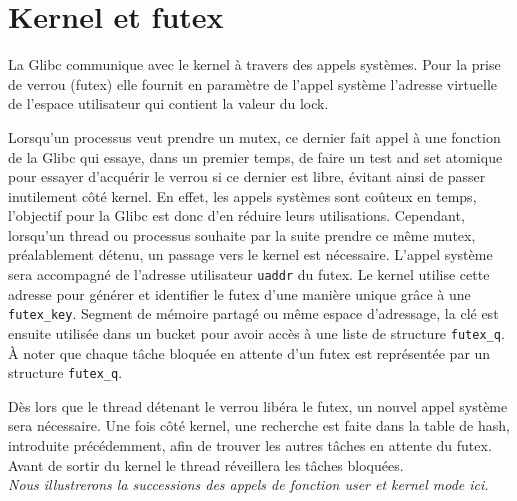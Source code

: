 \section*{Kernel et futex}
La Glibc communique avec le kernel à travers des appels systèmes. Pour la prise de verrou (futex) elle fournit en paramètre de l'appel système l'adresse virtuelle de l'espace utilisateur qui contient la valeur du lock.

Lorsqu'un processus veut prendre un mutex, ce dernier fait appel à une fonction 
de la Glibc qui essaye, dans un premier temps, de faire un test and set atomique pour essayer d'acquérir le verrou si ce dernier est libre, évitant ainsi de passer inutilement côté kernel. En effet, les appels systèmes sont coûteux en temps, l'objectif pour la Glibc est donc d'en réduire leurs utilisations. Cependant, lorsqu'un thread ou processus souhaite par la suite prendre ce même mutex, préalablement détenu, un passage vers le kernel est nécessaire. L'appel système sera accompagné de l'adresse utilisateur \verb|uaddr| du futex. Le kernel utilise cette adresse pour générer et identifier le futex d'une manière unique grâce à une \verb|futex_key|. Segment de mémoire partagé ou même espace d'adressage, la clé est ensuite utilisée dans un bucket pour avoir accès à une liste de structure \verb|futex_q|. À noter que chaque tâche bloquée en attente d'un futex est représentée par un structure \verb|futex_q|.

Dès lors que le thread détenant le verrou libéra le futex, un nouvel appel système sera nécessaire. Une fois côté kernel, une recherche est faite dans la table de hash, introduite précédemment, afin de trouver les autres tâches en attente du futex. Avant de sortir du kernel le thread réveillera les tâches bloquées. 
\\

\textit{Nous illustrerons la successions des appels de fonction user et kernel mode ici.}
